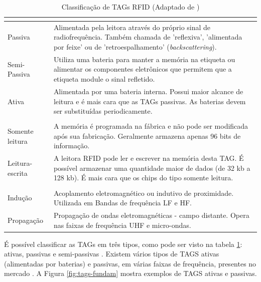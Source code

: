  
\begin{table}[H]
\centering
\caption{Classificação de TAGs RFID (Adaptado de \cite{AhmedIntegrationStreamMapping})}
\label{tab:comparativoTags}
\begin{tabular}{p{3cm}p{9cm}}
\hline
\multicolumn{2}{c}{\cellcolor{lightgray}{Origem da alimentação elétrica}} \\ \hline
Passiva         &   Alimentada pela leitora através do próprio sinal de radiofrequência. Também chamada de 'reflexiva', 'alimentada por feixe' ou de 'retroespalhamento' (\textit{backscattering}).     \\ \hline
Semi-Passiva    &   Utiliza uma bateria para manter a memória na etiqueta ou alimentar os componentes eletrônicos que permitem que a etiqueta module o sinal refletido.    \\ \hline
Ativa           &   Alimentada por uma bateria interna. Possui maior alcance de leitura e é mais cara que as TAGs passivas. As baterias devem ser substituídas periodicamente.    \\ \hline
\multicolumn{2}{c}{\cellcolor{lightgray}{Tipo de Memória}} \\ \hline
Somente leitura       &   A memória é programada na fábrica e não pode ser modificada após sua fabricação. Geralmente armazena apenas 96 bits de informação.       \\ \hline
Leitura-escrita    &   A leitora RFID pode ler e escrever na memória desta TAG. É possível armazenar uma quantidade maior de dados (de 32 kb a 128 kb). É mais cara que os chips do tipo somente leitura.   \\ \hline
\multicolumn{2}{c}{\cellcolor{lightgray}{Tipo de Comunicação entre a TAG e a Leitora}} \\ \hline
Indução       &   Acoplamento eletromagnético ou indutivo de proximidade. Utilizada em Bandas de frequência LF e HF.       \\ \hline
Propagação    &   Propagação de ondas eletromagnéticas - campo distante. Opera nas faixas de frequência UHF e micro-ondas.   \\ \hline
\end{tabular}
\end{table}



É possível classificar as TAGs em três tipos, como pode ser visto na tabela \ref{tab:comparativoTags}: ativas, passivas e semi-passivas \cite{chawla2007overview}.  Existem vários tipos de TAGS ativas (alimentadas por baterias) e passivas, em várias faixas de frequência, presentes no mercado \cite{rao1999overview}. A Figura \ref{fig:tags-fundam} mostra exemplos de TAGS ativas e passivas.



